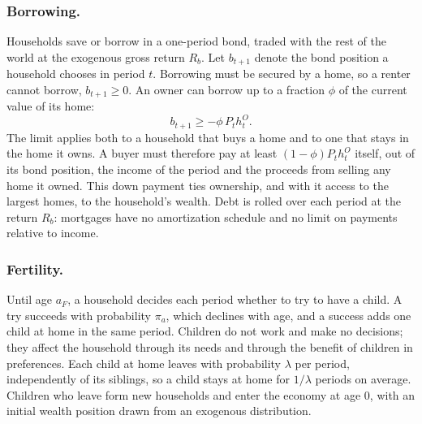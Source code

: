 \subsubsection*{Borrowing.}
Households save or borrow in a one-period bond, traded with the rest of the
world at the exogenous gross return $R_b$. Let $b_{t+1}$ denote the bond
position a household chooses in period $t$.
Borrowing must be secured by a home, so a renter cannot borrow,
$b_{t+1}\ge0$. An owner can borrow up to a fraction $\phi$ of the current
value of its home:
\begin{equation}
 b_{t+1}\ge-\phi\,P_th^O_t .
 \label{eq:m-ltv}
\end{equation}
The limit applies both to a household that buys a home and to one that stays
in the home it owns. A buyer must therefore pay at least $(1-\phi)P_th^O_t$
itself, out of its bond position, the income of the period and the proceeds
from selling any home it owned. This down payment ties ownership, and with it
access to the largest homes, to the household's wealth. Debt is rolled over
each period at the return $R_b$: mortgages have no amortization schedule and
no limit on payments relative to income.

\subsubsection*{Fertility.}
Until age $a_F$, a household decides each period whether to try to have a
child. A try succeeds with probability $\pi_a$, which declines with age, and a
success adds one child at home in the same period. Children do not work and
make no decisions; they affect the household through its needs and through
the benefit of children in preferences. Each child at home leaves with
probability $\lambda$ per period, independently of its siblings, so a child
stays at home for $1/\lambda$ periods on average. Children who leave form new
households and enter the economy at age $0$, with an initial wealth position
drawn from an exogenous distribution.

